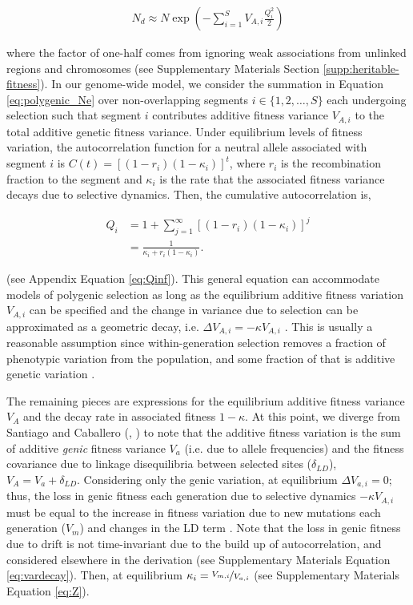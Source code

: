 \documentclass[11pt]{article}
\begin{document}
\begin{align}
    \label{eq:polygenic_Ne}
    N_d \approx N \exp\left(-\sum_{i=1}^S V_{A,i} \frac{Q_i^2}{2}\right)
\end{align}

where the factor of one-half comes from ignoring weak associations from
unlinked regions and chromosomes (see Supplementary Materials Section
\ref{supp:heritable-fitness}). In our genome-wide model, we consider the
summation in Equation \eqref{eq:polygenic_Ne} over non-overlapping segments $i
\in \{1, 2, \ldots, S\}$ each undergoing selection such that segment $i$
contributes additive fitness variance $V_{A,i}$ to the total additive genetic
fitness variance. Under equilibrium levels of fitness variation, the
autocorrelation function for a neutral allele associated with segment $i$ is
$C(t) = [(1-r_i)(1-\kappa_i)]^t$, where $r_i$ is the recombination fraction to
the segment and $\kappa_i$ is the rate that the associated fitness variance
decays due to selective dynamics. Then, the cumulative autocorrelation is,

\begin{align}
    \label{eq:Q}
    Q_i &= 1 + \sum_{j=1}^\infty \left[(1-r_i)(1-\kappa_i)\right]^j \nonumber \\
        &= \frac{1}{\kappa_i + r_i(1-\kappa_i)}.
\end{align}

(see Appendix Equation \ref{eq:Qinf}). This general equation can accommodate
models of polygenic selection as long as the equilibrium additive fitness
variation $V_{A,i}$ can be specified and the change in variance due to
selection can be approximated as a geometric decay, i.e. $\Delta V_{A,i} =
-\kappa V_{A,i}$ \parencite{Bulmer1971-ae,Keightley1988-eq,Walsh2018-bt}. This
is usually a reasonable assumption since within-generation selection removes a
fraction of phenotypic variation from the population, and some fraction of that
is additive genetic variation \parencite{Bulmer1971-ae,Keightley1988-eq}.

The remaining pieces are expressions for the equilibrium additive fitness
variance $V_A$ and the decay rate in associated fitness $1-\kappa$. At this
point, we diverge from Santiago and Caballero (\citeyear{Santiago1998-bs},
\citeyear{Santiago2016-mu}) to note that the additive fitness variation is the
sum of additive \emph{genic} fitness variance $V_a$ (i.e. due to allele
frequencies) and the fitness covariance due to linkage disequilibria between
selected sites ($\delta_{LD}$), $V_A = V_a + \delta_{LD}$. Considering only the
genic variation, at equilibrium $\Delta V_{a,i} = 0$; thus, the loss in genic
fitness each generation due to selective dynamics $-\kappa V_{A,i}$ must be
equal to the increase in fitness variation due to new mutations each generation
($V_m$) and changes in the LD term \parencite{Bulmer1971-ae}. Note that the
loss in genic fitness due to drift is not time-invariant due to the build up of
autocorrelation, and considered elsewhere in the derivation (see Supplementary
Materials Equation \ref{eq:vardecay}). Then, at equilibrium $\kappa_i =
\nicefrac{V_{m,i}}{V_{a,i}}$ (see Supplementary Materials Equation \ref{eq:Z}). 
\end{document}
